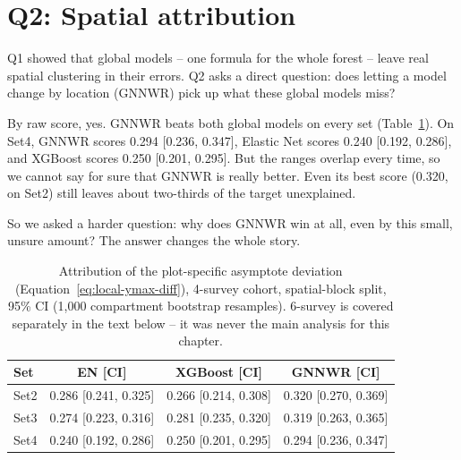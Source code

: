 
\section{Q2: Spatial attribution}

Q1 showed that global models -- one formula for the whole forest -- leave real spatial clustering in their errors. Q2 asks a direct question: does letting a model change by location (GNNWR) pick up what these global models miss?

By raw score, yes. GNNWR beats both global models on every set (Table~\ref{tab:results-q2}). On Set4, GNNWR scores 0.294 [0.236, 0.347], Elastic Net scores 0.240 [0.192, 0.286], and XGBoost scores 0.250 [0.201, 0.295]. But the ranges overlap every time, so we cannot say for sure that GNNWR is really better. Even its best score (0.320, on Set2) still leaves about two-thirds of the target unexplained.

So we asked a harder question: why does GNNWR win at all, even by this small, unsure amount? The answer changes the whole story.

\begin{table}[!htbp]
\centering
\scriptsize
\renewcommand{\arraystretch}{1.2}
\begin{tabular}{lccc}
\toprule
Set & EN [CI] & XGBoost [CI] & GNNWR [CI] \\
\midrule
Set2 & 0.286 [0.241, 0.325] & 0.266 [0.214, 0.308] & 0.320 [0.270, 0.369] \\
Set3 & 0.274 [0.223, 0.316] & 0.281 [0.235, 0.320] & 0.319 [0.263, 0.365] \\
Set4 & 0.240 [0.192, 0.286] & 0.250 [0.201, 0.295] & 0.294 [0.236, 0.347] \\
\bottomrule
\end{tabular}
\caption{\small{Attribution of the plot-specific asymptote deviation
(Equation~\ref{eq:local-ymax-diff}), 4-survey cohort, spatial-block split, 95\% CI (1,000
compartment bootstrap resamples). 6-survey is covered separately in the text below -- it
was never the main analysis for this chapter.}}
\label{tab:results-q2}
\end{table}

